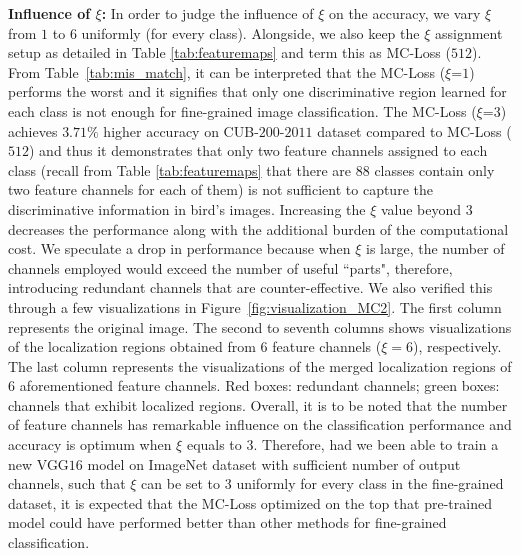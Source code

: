 \documentclass[journal]{IEEEtran}
\begin{document}
\noindent \textbf{Influence of $\xi$:}  In order to judge the influence of $\xi$ on the accuracy, we vary $\xi$ from $1$ to $6$ uniformly (for every class). Alongside, we also keep the $\xi$ assignment setup as detailed in Table \ref{tab:featuremaps} and term this as MC-Loss ($512$). From Table~\ref{tab:mis_match}, it can be interpreted that the MC-Loss ($\xi$=$1$) performs the worst and it signifies that only one discriminative region learned for each class is not enough for fine-grained image classification. The MC-Loss ($\xi$=$3$) achieves $3.71\%$ higher accuracy on CUB-$200$-$2011$ dataset compared to  MC-Loss ($512$) and thus it demonstrates that only two feature channels assigned to each class (recall from Table \ref{tab:featuremaps} that there are $88$ classes contain only two feature channels for each of them) is not sufficient to capture the discriminative information in bird's images. Increasing the $\xi$ value beyond $3$ decreases the performance along with the additional burden of the computational cost.
We speculate a drop in performance because when $\xi$ is large, the number of channels employed would exceed the number of useful ``parts", therefore, introducing redundant channels that are counter-effective. We also verified this through a few visualizations in Figure~\ref{fig:visualization_MC2}. The first column represents the original image. The second to seventh columns shows visualizations of the localization regions obtained from $6$ feature channels ($\xi=6$), respectively. The last column represents the visualizations of the merged localization regions of $6$ aforementioned feature channels. Red boxes: redundant channels; green boxes: channels that exhibit localized regions. Overall, it is to be noted that the number of feature channels has remarkable influence on the classification performance and accuracy is optimum when $\xi$ equals to $3$. Therefore, had we been able to train a new VGG$16$ model on ImageNet dataset with sufficient number of output channels, such that $\xi$ can be set to $3$ uniformly for every class in the fine-grained dataset, it is expected that the MC-Loss optimized on the top that pre-trained model could have performed better than other methods for fine-grained classification.  
\end{document}
